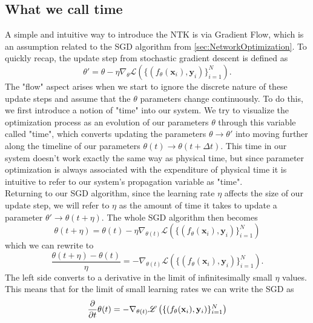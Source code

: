 \subsection{What we call time}
A simple and intuitive way to introduce the NTK is via Gradient Flow, which is an assumption related to the SGD algorithm from \cref{sec:NetworkOptimization}. To quickly recap, the update step from stochastic gradient descent is defined as 
\begin{equation}
	\theta' = \theta - \eta \nabla_\theta \mathscr{L}\left( \{(f_\theta(\mathbf{x}_i), \mathbf{y}_i)\}_{i=1}^{N} \right).
\end{equation}
The "flow" aspect arises when we start to ignore the discrete nature of these update steps and assume that the $\theta$ parameters change continuously. To do this, we first introduce a notion of "time" into our system. We try to visualize the optimization process as an evolution of our parameters $\theta$ through this variable called "time", which converts updating the parameters $\theta \rightarrow \theta'$ into moving further along the timeline of our parameters $\theta(t) \rightarrow \theta(t+\Delta t)$. This time in our system doesn't work exactly the same way as physical time, but since parameter optimization is always associated with the expenditure of physical time it is intuitive to refer to our system's propagation variable as "time". \\
Returning to our SGD algorithm, since the learning rate $\eta$ affects the size of our update step, we will refer to $\eta$ as the amount of time it takes to update a parameter $\theta' \rightarrow \theta(t+\eta)$. The whole SGD algorithm then becomes
\begin{equation}
	\theta(t+\eta) = \theta(t) - \eta \nabla_{\theta(t)} \mathscr{L}\left( \{(f_\theta(\mathbf{x}_i), \mathbf{y}_i)\}_{i=1}^{N} \right)
\end{equation}
which we can rewrite to 
\begin{equation}
	\frac{\theta(t+\eta)-\theta(t)}{\eta} = - \nabla_{\theta(t)} \mathscr{L}\left( \{(f_\theta(\mathbf{x}_i), \mathbf{y}_i)\}_{i=1}^{N} \right).
\end{equation}
The left side converts to a derivative in the limit of infinitesimally small $\eta$ values. This means that for the limit of small learning rates we can write the SGD as 
\begin{equation}\label{eq:NTKThetaDerivative}
	\frac{\partial}{\partial t}\theta(t) = - \nabla_{\theta(t)} \mathscr{L}\left( \{(f_\theta(\mathbf{x}_i), \mathbf{y}_i)\}_{i=1}^{N} \right)
\end{equation}
